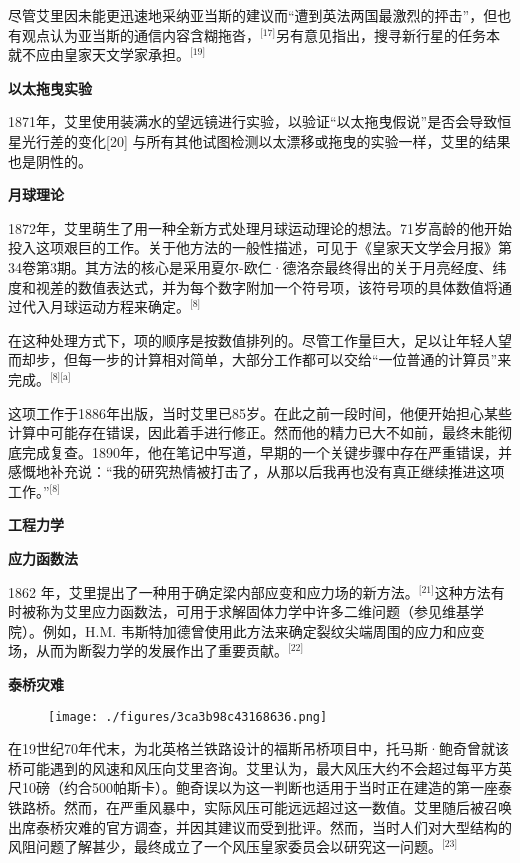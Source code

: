 尽管艾里因未能更迅速地采纳亚当斯的建议而“遭到英法两国最激烈的抨击”，但也有观点认为亚当斯的通信内容含糊拖沓，\(^\text{[17]}\)另有意见指出，搜寻新行星的任务本就不应由皇家天文学家承担。\(^\text{[19]}\)

\textbf{以太拖曳实验}

1871年，艾里使用装满水的望远镜进行实验，以验证“以太拖曳假说”是否会导致恒星光行差的变化[20] 与所有其他试图检测以太漂移或拖曳的实验一样，艾里的结果也是阴性的。

\textbf{月球理论}

1872年，艾里萌生了用一种全新方式处理月球运动理论的想法。71岁高龄的他开始投入这项艰巨的工作。关于他方法的一般性描述，可见于《皇家天文学会月报》第34卷第3期。其方法的核心是采用夏尔-欧仁·德洛奈最终得出的关于月亮经度、纬度和视差的数值表达式，并为每个数字附加一个符号项，该符号项的具体数值将通过代入月球运动方程来确定。\(^\text{[8]}\)

在这种处理方式下，项的顺序是按数值排列的。尽管工作量巨大，足以让年轻人望而却步，但每一步的计算相对简单，大部分工作都可以交给“一位普通的计算员”来完成。\(^\text{[8][a]}\)

这项工作于1886年出版，当时艾里已85岁。在此之前一段时间，他便开始担心某些计算中可能存在错误，因此着手进行修正。然而他的精力已大不如前，最终未能彻底完成复查。1890年，他在笔记中写道，早期的一个关键步骤中存在严重错误，并感慨地补充说：“我的研究热情被打击了，从那以后我再也没有真正继续推进这项工作。”\(^\text{[8]}\)

\textbf{工程力学}

\textbf{应力函数法}

1862 年，艾里提出了一种用于确定梁内部应变和应力场的新方法。\(^\text{[21]}\)这种方法有时被称为艾里应力函数法，可用于求解固体力学中许多二维问题（参见维基学院）。例如，H.M. 韦斯特加德曾使用此方法来确定裂纹尖端周围的应力和应变场，从而为断裂力学的发展作出了重要贡献。\(^\text{[22]}\)

\textbf{泰桥灾难}
\begin{figure}[ht]
\centering
\texttt{[image: ./figures/3ca3b98c43168636.png]}
\caption{} \label{fig_AL_7}
\end{figure}
在19世纪70年代末，为北英格兰铁路设计的福斯吊桥项目中，托马斯·鲍奇曾就该桥可能遇到的风速和风压向艾里咨询。艾里认为，最大风压大约不会超过每平方英尺10磅（约合500帕斯卡）。鲍奇误以为这一判断也适用于当时正在建造的第一座泰铁路桥。然而，在严重风暴中，实际风压可能远远超过这一数值。艾里随后被召唤出席泰桥灾难的官方调查，并因其建议而受到批评。然而，当时人们对大型结构的风阻问题了解甚少，最终成立了一个风压皇家委员会以研究这一问题。\(^\text{[23]}\)

